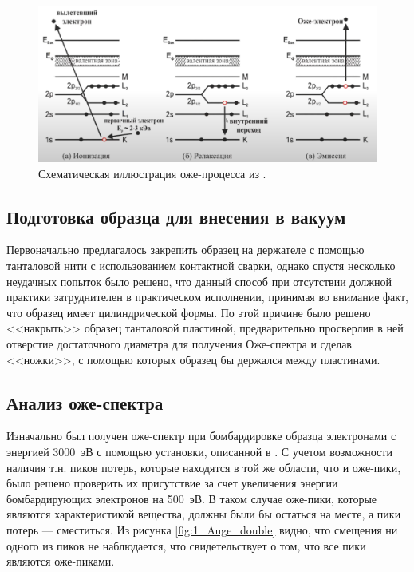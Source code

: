 \documentclass[a4paper, 12pt]{article}
\begin{document}
	\begin{figure}[H]
		\centering
		\includegraphics[width=0.7\linewidth]{1_diag}
		\caption{Схематическая иллюстрация оже-процесса из \cite{Auge_diag}.}
		\label{fig:1_diag}
	\end{figure}
	
	\subsection{Подготовка образца для внесения в вакуум}
	
	Первоначально предлагалось закрепить образец на держателе с помощью танталовой нити с использованием контактной сварки, однако спустя несколько неудачных попыток было решено, что данный способ при отсутствии должной практики затруднителен в практическом исполнении, принимая во внимание факт, что образец имеет цилиндрической формы. По этой причине было решено <<накрыть>> образец танталовой пластиной, предварительно просверлив в ней отверстие достаточного диаметра для получения Оже-спектра и сделав <<ножки>>, с помощью которых образец бы держался между пластинами.
	
	
	\subsection{Анализ оже-спектра}
	
	Изначально был получен оже-спектр при бомбардировке образца электронами с энергией 3000~эВ с помощью установки, описанной в \cite{Auger_spectr}. С учетом возможности наличия т.н. пиков потерь, которые находятся в той же области, что и оже-пики, было решено проверить их присутствие за счет увеличения энергии бомбардирующих электронов на 500~эВ. В таком случае оже-пики, которые являются характеристикой вещества, должны были бы остаться на месте, а пики потерь --- сместиться. Из рисунка \ref{fig:1_Auge_double} видно, что смещения ни одного из пиков не наблюдается, что свидетельствует о том, что все пики являются оже-пиками.
	
\end{document}
